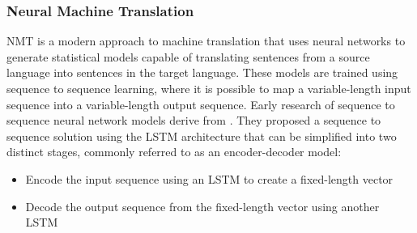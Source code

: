 


\clearpage
\subsubsection{Neural Machine Translation}

\acrfull{NMT} is a modern approach to machine translation that uses neural networks to generate statistical models capable of translating sentences from a source language into sentences in the target language.
These models are trained using sequence to sequence learning, where it is possible to map a variable-length input sequence into a variable-length output sequence. %
Early research of sequence to sequence neural network models derive from \cite{sutskever_sequence_2014}. They proposed a sequence to sequence solution using the \acrshort{LSTM} architecture that can be simplified into two distinct stages, commonly referred to as an encoder-decoder model:
\begin{itemize}
    \item Encode the input sequence using an \acrshort{LSTM} to create a fixed-length vector
    \item Decode the output sequence from the fixed-length vector using another \acrshort{LSTM}
\end{itemize}

